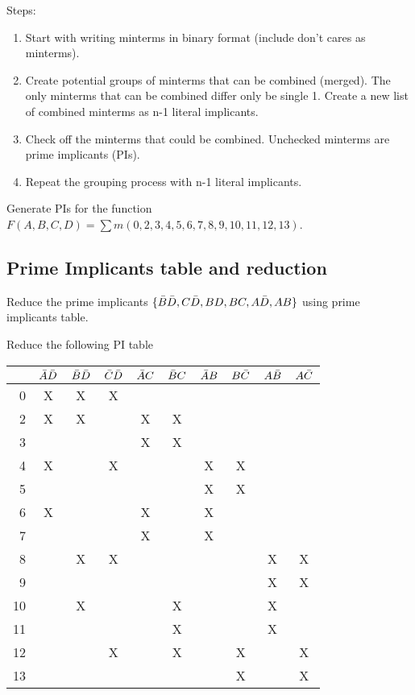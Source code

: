 Steps:
\begin{enumerate}
  \item Start with writing minterms in binary format (include don't cares as minterms).
  \item Create potential groups of minterms that can be combined (merged). The only
    minterms that can be combined differ only be single 1. Create a new list of
    combined minterms as n-1 literal implicants.
  \item Check off the minterms that could be combined. Unchecked minterms are
    prime implicants (PIs).
  \item Repeat the grouping process with n-1 literal implicants.
\end{enumerate}

\begin{prob}
  Generate PIs for the function $ F(A, B, C, D) = \sum m(0, 2, 3, 4, 5, 6, 7, 8,
  9, 10, 11, 12, 13)$.
\end{prob}

\subsection{Prime Implicants table and reduction}

\begin{example}
  Reduce the prime implicants $\{ \bar{B} \bar{D}, C\bar{D}, BD, BC, A\bar{D}, AB \}$ using prime
  implicants table.
\end{example}
\vspace{20em}

\begin{example}
  Reduce the following PI table\\
  \begin{tabular}{r|ccccccccc}
    \toprule
    & $\bar{A}\bar{D}$ & $\bar{B}\bar{D}$ & $\bar{C}\bar{D}$ & $\bar{A} C$ & $\bar{B} C$ & $\bar{A} B$ & $B \bar{C}$& $A\bar{B}$ & $A \bar{C}$ \\
    \midrule
     0 & X & X & X &   &   &   &   &   &   \\
     2 & X & X &   & X & X &   &   &   &   \\
     3 &   &   &   & X & X &   &   &   &   \\
     4 & X &   & X &   &   & X & X &   &   \\
     5 &   &   &   &   &   & X & X &   &   \\
     6 & X &   &   & X &   & X &   &   &   \\
     7 &   &   &   & X &   & X &   &   &   \\
     8 &   & X & X &   &   &   &   & X & X \\
     9 &   &   &   &   &   &   &   & X & X \\
    10 &   & X &   &   & X &   &   & X &   \\
    11 &   &   &   &   & X &   &   & X &   \\
    12 &   &   & X &   & X &   & X &   & X \\
    13 &   &   &   &   &   &   & X &   & X \\
    \bottomrule
  \end{tabular}
\end{example}
\vspace{20em}

